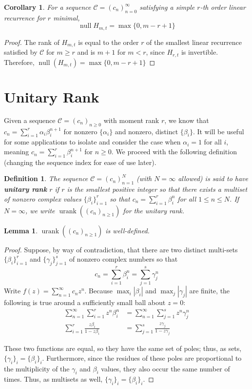 \documentclass[12pt,reqno]{article}
\newtheorem{lemma}{Lemma}
\newtheorem{definition}{Definition}
\newtheorem{cor}{Corollary}
\newcommand{\cC}{\mathcal{C}}
\DeclareMathOperator{\urank}{urank}
\DeclareMathOperator{\nul}{null}
\begin{document}
\begin{cor}
For a sequence $\mathcal{C} = (c_n)_{n=0}^\infty$ satisfying a simple $r$-th order linear recurrence for $r$ minimal, 
$$
\nul H_{m,t} = \max\{0,m-r+1\}
$$
\end{cor}
\begin{proof}
The rank of $H_{m,t}$ is equal to the order $r$ of the smallest linear recurrence satisfied by $\mathcal{C}$ for $m \geq r$ and is $m+1$ for $m < r$, since $H_{r,t}$ is invertible.  Therefore, $\nul(H_{m,t}) = \max\{0,m-r+1\}$
\end{proof}

\section{Unitary Rank}

Given a sequence $\cC = (c_n)_{n\geq 0}$ with moment rank $r$, we know that $c_n = \sum_{i=1}^r \alpha_i\beta_i^{n+1}$ for nonzero $\{\alpha_i\}$ and nonzero, distinct $\{\beta_i\}$. It will be useful for some applications to isolate and consider the case when $\alpha_i = 1$ for all $i$, meaning $c_n = \sum_{i=1}^r \beta_i^{n+1}$ for $n \geq 0$. We proceed with the following definition (changing the sequence index for ease of use later).

\begin{definition}\label{Def:urank}
The sequence $\mathcal{C} = (c_n)_{n=1}^N$ (with $N = \infty$ allowed) is said to have \textbf{unitary rank} $r$ if $r$ is the smallest positive integer so that there exists a multiset of nonzero complex values $\{\beta_i\}_{i=1}^r$ so that $c_n=\sum_{i=1}^r \beta_i^{n}$ for all $1 \leq n \leq N$. If $N = \infty$, we write $\urank((c_n)_{n \geq 1})$ for the unitary rank.
\end{definition}

\begin{lemma} \label{lem:DCisMeaningful}
$\urank((c_n)_{n \geq 1})$ is well-defined.
\end{lemma}
\begin{proof}
Suppose, by way of contradiction, that there are two distinct multi-sets $\{\beta_i\}_{i=1}^r$ and $\{\gamma_j\}_{j=1}^s$ of nonzero complex numbers so that  $$c_n=\sum_{i=1}^r\beta_i^{n}=\sum_{j=1}^s\gamma_j^{n}$$ Write $f(z)=\sum_{n=1}^\infty c_n z^n$. Because $\max_i|\beta_i|$ and $\max_j|\gamma_j|$ are finite, the following is true around a sufficiently small ball about $z=0$: 
\begin{align*} 
\sum_{n=1}^\infty \sum_{i=1}^r z^n\beta_i^{n} &= \sum_{n=1}^\infty \sum_{j=1}^s z^n\gamma_j^{n} \\
\sum_{i=1}^r \frac{z\beta_i}{1-z\beta_i} &= \sum_{j=1}^s \frac{z\gamma_j}{1-z\gamma_j}
\end{align*}


These two functions are equal, so they have the same set of poles; thus, as sets, $\{\gamma_i\}_i = \{\beta_i\}_i$.  Furthermore, since the residues of these poles are proportional to the multiplicity of the $\gamma_i$ and $\beta_i$ values, they also occur the same number of times.  Thus, as multisets as well, $\{\gamma_i\}_i = \{\beta_i\}_i$.

\end{proof}
\end{document}
